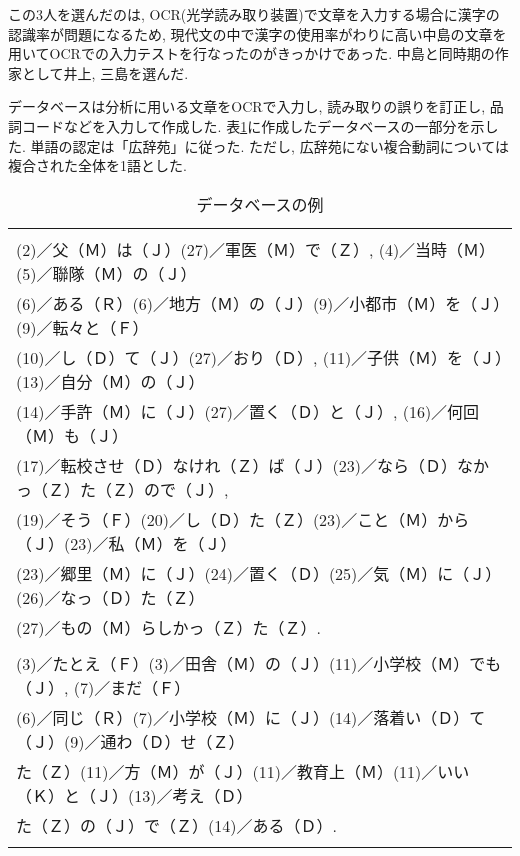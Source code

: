 この3人を選んだのは, OCR(光学読み取り装置)で文章を入力する場合に漢字の認識率が問題になるため, 現代文の中で漢字の使用率がわりに高い中島の文章を用いてOCRでの入力テストを行なったのがきっかけであった. 中島と同時期の作家として井上, 三島を選んだ. 

データベースは分析に用いる文章をOCRで入力し, 読み取りの誤りを訂正し, 品詞コードなどを入力して作成した. 表\ref{datas}に作成したデータベースの一部分を示した. 単語の認定は「広辞苑」に従った. ただし, 広辞苑にない複合動詞については複合された全体を1語とした.

\begin{table}[htb]
\caption{\dg データベースの例}\label{datas}
\begin{center}\footnotesize
\renewcommand{\arraystretch}{}
\begin{tabular}{l} \hline
\\
(2)／父（Ｍ）は（Ｊ）(27)／軍医（Ｍ）で（Ｚ）, (4)／当時（Ｍ）(5)／聯隊（Ｍ）の（Ｊ）\\
(6)／ある（Ｒ）(6)／地方（Ｍ）の（Ｊ）(9)／小都市（Ｍ）を（Ｊ）(9)／転々と（Ｆ）\\
(10)／し（Ｄ）て（Ｊ）(27)／おり（Ｄ）, (11)／子供（Ｍ）を（Ｊ）(13)／自分（Ｍ）の（Ｊ）\\
(14)／手許（Ｍ）に（Ｊ）(27)／置く（Ｄ）と（Ｊ）, (16)／何回（Ｍ）も（Ｊ）\\
(17)／転校させ（Ｄ）なけれ（Ｚ）ば（Ｊ）(23)／なら（Ｄ）なかっ（Ｚ）た（Ｚ）ので（Ｊ）, \\
(19)／そう（Ｆ）(20)／し（Ｄ）た（Ｚ）(23)／こと（Ｍ）から（Ｊ）(23)／私（Ｍ）を（Ｊ）\\
(23)／郷里（Ｍ）に（Ｊ）(24)／置く（Ｄ）(25)／気（Ｍ）に（Ｊ）(26)／なっ（Ｄ）た（Ｚ）\\
(27)／もの（Ｍ）らしかっ（Ｚ）た（Ｚ）. \\
\\
(3)／たとえ（Ｆ）(3)／田舎（Ｍ）の（Ｊ）(11)／小学校（Ｍ）でも（Ｊ）, (7)／まだ（Ｆ）\\
(6)／同じ（Ｒ）(7)／小学校（Ｍ）に（Ｊ）(14)／落着い（Ｄ）て（Ｊ）(9)／通わ（Ｄ）せ（Ｚ）\\
た（Ｚ）(11)／方（Ｍ）が（Ｊ）(11)／教育上（Ｍ）(11)／いい（Ｋ）と（Ｊ）(13)／考え（Ｄ）\\
た（Ｚ）の（Ｊ）で（Ｚ）(14)／ある（Ｄ）. \\

\\ \hline
\end{tabular}
\end{center}
\hspace*{0.8cm}{\footnotesize 記号／は文節の境界線で, (数字)は(数字)の直後の文節が係る文節の番号で,（ローマ字）は品詞コードである. }
\end{table}


